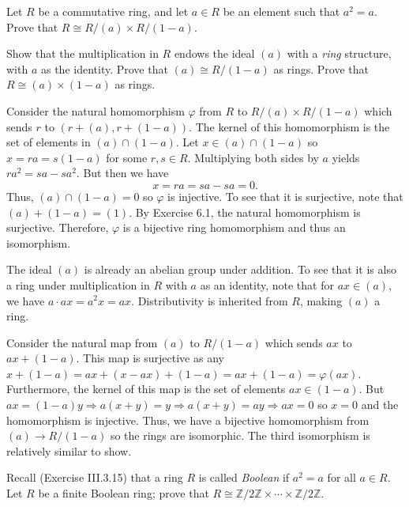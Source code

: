 \documentclass[../../master.tex]{subfiles}
\begin{document}
\begin{problem}
    Let $R$ be a commutative ring, and let $a \in R$ be an element such that $a^2 = a$.
    Prove that $R \cong R / (a) \times R / (1-a)$.

    Show that the multiplication in $R$ endows the ideal $(a)$ with a \textit{ring} structure, with $a$ as the identity.
    Prove that $(a) \cong R / (1-a)$ as rings.
    Prove that $R \cong (a) \times (1-a)$ as rings.
\end{problem}

\begin{solution}
    Consider the natural homomorphism $\varphi$ from $R$ to $R / (a) \times R / (1 - a)$ which sends $r$ to $(r + (a), r + (1-a))$. 
    The kernel of this homomorphism is the set of elements in $(a) \cap (1-a)$.
    Let $x \in (a) \cap (1-a)$ so $x = ra = s(1-a)$ for some $r, s \in R$.
    Multiplying both sides by $a$ yields $ra^2 = sa - sa^2$. 
    But then we have
    \[
    x = ra = sa - sa = 0.
    \]
    Thus, $(a) \cap (1-a) = 0$ so $\varphi$ is injective.
    To see that it is surjective, note that $(a) + (1-a) = (1)$.
    By Exercise 6.1, the natural homomorphism is surjective.
    Therefore, $\varphi$ is a bijective ring homomorphism and thus an isomorphism.

    The ideal $(a)$ is already an abelian group under addition.
    To see that it is also a ring under multiplication in $R$ with $a$ as an identity, note that for $ax \in (a)$, we have $a \cdot ax = a^2x = ax$.
    Distributivity is inherited from $R$, making $(a)$ a ring.

    Consider the natural map from $(a)$ to $R / (1-a)$ which sends $ax$ to $ax + (1-a)$.
    This map is surjective as any $x + (1-a) = ax + (x - ax) + (1 - a) = ax + (1 - a) = \varphi(ax)$.
    Furthermore, the kernel of this map is the set of elements $ax \in (1-a)$.
    But $ax = (1-a)y \Longrightarrow a(x + y) = y \Longrightarrow a(x + y) = ay \Longrightarrow ax = 0$ so $x = 0$ and the homomorphism is injective.
    Thus, we have a bijective homomorphism from $(a) \to R / (1-a)$ so the rings are isomorphic.
    The third isomorphism is relatively similar to show.
\end{solution}

\begin{problem}
    Recall (Exercise III.3.15) that a ring $R$ is called  \textit{Boolean} if $a^2 = a$ for all $a \in R$.
    Let $R$ be a finite Boolean ring;
    prove that $R \cong \mathbb{Z} / 2\mathbb{Z} \times \cdots \times \mathbb{Z} / 2\mathbb{Z}$.
\end{problem}
\end{document}
